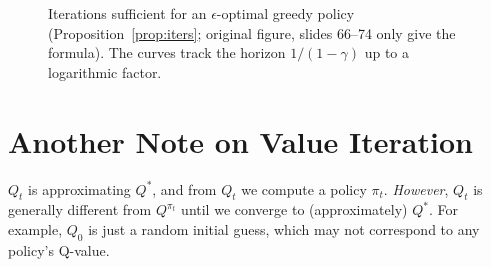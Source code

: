 \documentclass[11pt,a4paper]{article}
\theoremstyle{plain}
\theoremstyle{definition}
\theoremstyle{remark}
\begin{document}
\begin{figure}[htbp]
\centering
{}
\caption{Iterations sufficient for an $\epsilon$-optimal greedy policy (Proposition~\ref{prop:iters}; original figure, slides 66--74 only give the formula). The curves track the horizon $1/(1-\gamma)$ up to a logarithmic factor.}
\label{fig:iters}
\end{figure}

\section{Another Note on Value Iteration }
$Q_t$ is approximating $Q^*$, and from $Q_t$ we compute a policy $\pi_t$. \emph{However}, $Q_t$ is generally different from $Q^{\pi_t}$ until we converge to (approximately) $Q^*$. For example, $Q_0$ is just a random initial guess, which may not correspond to any policy's Q-value.
\end{document}
